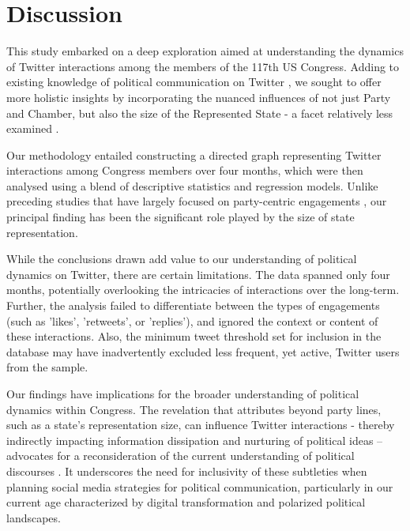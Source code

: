 \documentclass[11pt]{article}
\begin{document}
\section*{Discussion}

This study embarked on a deep exploration aimed at understanding the dynamics of Twitter interactions among the members of the 117th US Congress. Adding to existing knowledge of political communication on Twitter \cite{Aragn2013CommunicationDI, Theocharis2020TheDO, Hemphill2013WhatsCD, Straus2013CommunicatingI1}, we sought to offer more holistic insights by incorporating the nuanced influences of not just Party and Chamber, but also the size of the Represented State - a facet relatively less examined \cite{Chamberlain2021ANA, Valle2021PoliticalIB}.

Our methodology entailed constructing a directed graph representing Twitter interactions among Congress members over four months, which were then analysed using a blend of descriptive statistics and regression models. Unlike preceding studies that have largely focused on party-centric engagements \cite{Aragn2013CommunicationDI, Chamberlain2021ANA, Valle2021PoliticalIB}, our principal finding has been the significant role played by the size of state representation.

While the conclusions drawn add value to our understanding of political dynamics on Twitter, there are certain limitations. The data spanned only four months, potentially overlooking the intricacies of interactions over the long-term. Further, the analysis failed to differentiate between the types of engagements (such as 'likes', 'retweets', or 'replies'), and ignored the context or content of these interactions. Also, the minimum tweet threshold set for inclusion in the database may have inadvertently excluded less frequent, yet active, Twitter users from the sample.

Our findings have implications for the broader understanding of political dynamics within Congress. The revelation that attributes beyond party lines, such as a state’s representation size, can influence Twitter interactions - thereby indirectly impacting information dissipation and nurturing of political ideas – advocates for a reconsideration of the current understanding of political discourses \cite{Hemphill2013WhatsCD}. It underscores the need for inclusivity of these subtleties when planning social media strategies for political communication, particularly in our current age characterized by digital transformation and polarized political landscapes.
\end{document}

